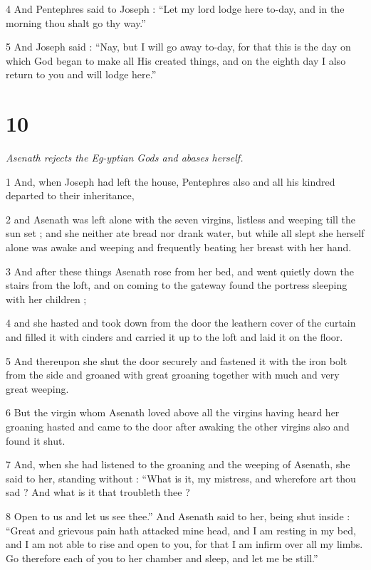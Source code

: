 4 And Pentephres said to Joseph : “Let my lord lodge here to-day, and in the morning thou shalt go thy way.” 

5 And Joseph said : “Nay, but I will go away to-day, for that this is the day on which God began to make all His created things, and on the eighth day I also return to you and will lodge here.”

\chapter{10}

\par \textit{Asenath rejects the Eg-yptian Gods and abases herself.}

1 And, when Joseph had left the house, Pentephres also and all his kindred departed to their inheritance, 

2 and Asenath was left alone with the seven virgins, listless and weeping till the sun set ; and she neither ate bread nor drank water, but while all slept she herself alone was awake and weeping and frequently beating her breast with her hand. 

3 And after these things Asenath rose from her bed, and went quietly down the stairs from the loft, and on coming to the gateway found the portress sleeping with her children ; 

4 and she hasted and took down from the door the leathern cover of the curtain and filled it with cinders and carried it up to the loft and laid it on the floor. 

5 And thereupon she shut the door securely and fastened it with the iron bolt from the side and groaned with great groaning together with much and very great weeping. 

6 But the virgin whom Asenath loved above all the virgins having heard her groaning hasted and came to the door after awaking the other virgins also and found it shut. 

7 And, when she had listened to the groaning and the weeping of Asenath, she said to her, standing without : “What is it, my mistress, and wherefore art thou sad ? And what is it that troubleth thee ? 

8 Open to us and let us see thee.” And Asenath said to her, being shut inside : “Great and grievous pain hath attacked mine head, and I am resting in my bed, and I am not able to rise and open to you, for that I am infirm over all my limbs. Go therefore each of you to her chamber and sleep, and let me be still.” 

